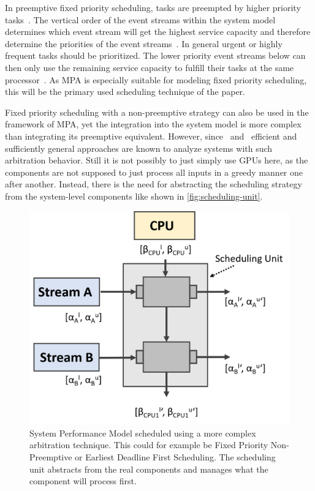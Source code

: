 In preemptive fixed priority scheduling, tasks are preempted by higher priority tasks~\cite{slo}.
The vertical order of the event streams within the system model determines which event stream will get the highest service capacity and therefore determine the priorities of the event streams~\cite{wan:06}.
In general urgent or highly frequent tasks should be prioritized.
The lower priority event streams below can then only use the remaining service capacity to fulfill their tasks at the same processor~\cite{mar}.
As MPA is especially suitable for modeling fixed priority scheduling, this will be the primary used scheduling technique of the paper.


Fixed priority scheduling with a non-preemptive strategy can also be used in the framework of MPA, yet
the integration into the system model is more complex than integrating its preemptive equivalent.
However, since~\cite{cho:08} and~\cite{sof:12/1} efficient and sufficiently general approaches are known 
to analyze systems with such arbitration behavior.
Still it is not possibly to just simply use GPUs here, as the components are not supposed to just process all inputs in a greedy manner one after another.
Instead, there is the need for abstracting the scheduling strategy from the system-level components like shown in \autoref{fig:scheduling-unit}.

\begin{figure}
    \centering
    \includegraphics[width=0.8\columnwidth]{graphics/scheduling_unit.png}
    \caption{System Performance Model scheduled using a more complex arbitration technique. This could for example be Fixed Priority Non-Preemptive or Earliest Deadline First Scheduling. %
    The scheduling unit abstracts from the real components and manages what the component will process first.}\label{fig:scheduling-unit}
\end{figure}

